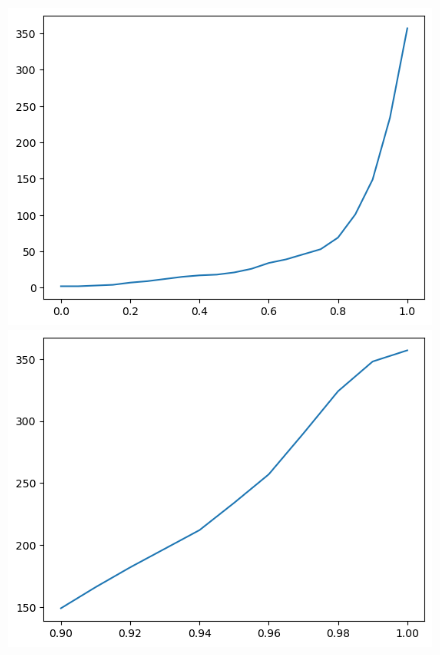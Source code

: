 \begin{figure}
	\centering
	\begin{minipage}{0.45\textwidth}
		\centering
		\includegraphics[width=\textwidth,height=\textheight,keepaspectratio]{img/alpha_groups_0.5_0.95.png}
		\subcaption{$\alpha\in[0.05,0.95]$}
	\end{minipage}
	\begin{minipage}{0.45\textwidth}
		\centering
		\includegraphics[width=\textwidth,height=\textheight,keepaspectratio]{img/alpha_groups_9.0_9.9.png}
		\subcaption{$\alpha\in[0.9,0.99]$}
	\end{minipage}
	\begin{minipage}{\textwidth}
		\centering
		\begin{tabular}{c|c|c|c|c|c|c|c|c|c|c}

\end{tabular}
\end{minipage}
\end{figure}
